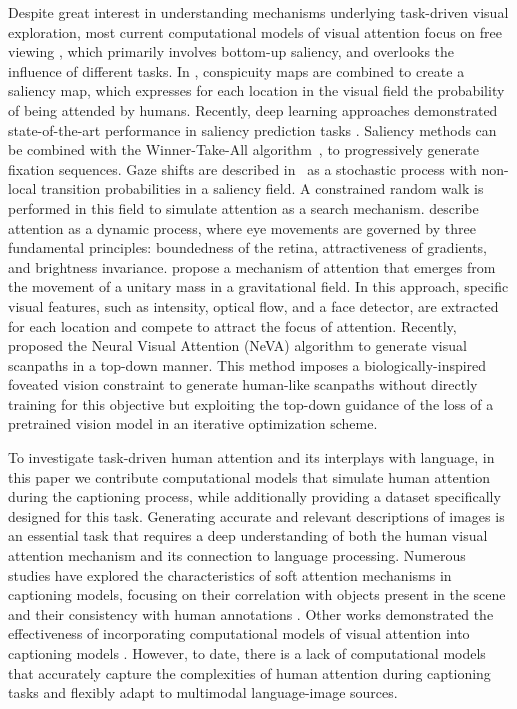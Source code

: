 \documentclass{article}
\begin{document}
Despite great interest in understanding mechanisms underlying task-driven visual exploration, most current computational models of visual attention focus on free viewing \citep{borji2012state}, which primarily involves bottom-up saliency, and overlooks the influence of different tasks. In \citet{itti1998model}, conspicuity maps are combined to create a saliency map, which expresses for each location in the visual field the probability of being attended by humans. Recently, deep learning approaches demonstrated state-of-the-art performance in saliency prediction tasks \citep{pan2017salgan,cornia2018sam,wang2019revisiting}. Saliency methods can be combined with the Winner-Take-All algorithm~\citep{koch1987shifts}, to progressively generate fixation sequences. Gaze shifts are described in~\citep{boccignone2004modelling} as a stochastic process with non-local transition probabilities in a saliency field. A constrained random walk is performed in this field to simulate attention as a search mechanism. 
\citet{zanca2017variational} describe attention as a dynamic process, where eye movements are governed by three fundamental principles: boundedness of the retina, attractiveness of gradients, and brightness invariance. \citet{zanca2019gravitational} propose a mechanism of attention that emerges from the movement of a unitary mass in a gravitational field. In this approach, specific visual features, such as intensity, optical flow, and a face detector, are extracted for each location and compete to attract the focus of attention. Recently, \citet{schwinn2022behind} proposed the Neural Visual Attention (NeVA) algorithm to generate visual scanpaths in a top-down manner. This method imposes a biologically-inspired foveated vision constraint to generate human-like scanpaths without directly training for this objective but exploiting the top-down guidance of the loss of a pretrained vision model in an iterative optimization scheme.

To investigate task-driven human attention and  its interplays with language, in this paper we contribute computational models that simulate human attention during the captioning process, while additionally providing a dataset specifically designed for this task. Generating accurate and relevant descriptions of images \citep{li2019visual,sharma2020image} is an essential task that requires a deep understanding of both the human visual attention mechanism and its connection to language processing. Numerous studies have explored the characteristics of soft attention mechanisms in captioning models, focusing on their correlation with objects present in the scene and their consistency with human annotations \citep{liu2017attention, mun2017text}. Other works demonstrated the effectiveness of incorporating computational models of visual attention into captioning models \citep{chen2018boosted}. However, to date, there is a lack of computational models that accurately capture the complexities of human attention during captioning tasks and flexibly adapt to multimodal language-image sources. 
\end{document}

